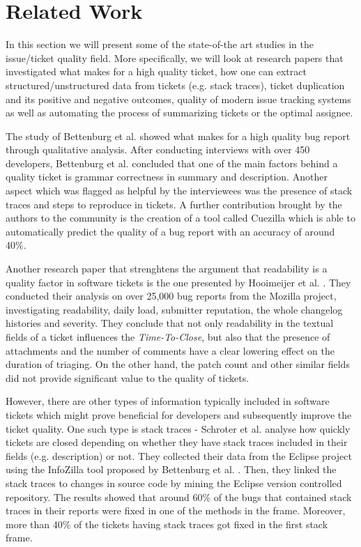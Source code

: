 \documentclass{mpaper}
\begin{document}
\section{Related Work}\label{related_work}

In this section we will present some of the state-of-the art studies in the issue/ticket quality 
field. More specifically, we will look at research papers that investigated what makes for a high quality ticket, 
how one can extract structured/unstructured data from tickets (e.g. stack traces), ticket duplication and its 
positive and negative outcomes, quality of modern issue tracking systems as well as automating the process 
of summarizing tickets or the optimal assignee. 

The study of Bettenburg et al. \cite{bettenburg2008makes} showed what 
makes for a high quality bug report through qualitative analysis. 
After conducting interviews with over 450 developers, Bettenburg et al. concluded that one of the main factors
behind a quality ticket is grammar correctness in summary and description. Another
aspect which was flagged as helpful by the interviewees was the presence of stack 
traces and steps to reproduce in tickets. A further contribution brought by the
authors to the community is the creation of a tool called Cuezilla which is able 
to automatically predict the quality of a bug report with an accuracy of around 40\%.

Another research paper that strenghtens the argument that readability is a quality 
factor in software tickets is the one presented by Hooimeijer et al. \cite{hooimeijer2007modeling}.
They conducted their analysis on over 25,000 bug reports from the Mozilla project, 
investigating readability, daily load, submitter reputation, the whole changelog histories 
and severity. They conclude that not only readability in the textual fields of a ticket
influences the \emph{Time-To-Close}, but also that the presence of attachments and 
the number of comments have a clear lowering effect on the duration of triaging. On the 
other hand, the patch count and other similar fields did not provide significant 
value to the quality of tickets.

However, there are other types of information typically included in software tickets 
which might prove beneficial for developers and subsequently improve the ticket quality.
One such type is stack traces - Schroter et al. \cite{schroter2010stack} analyse how 
quickly tickets are closed depending on whether they have stack traces included in their fields 
(e.g. description) or not. They collected their data from the Eclipse project using 
the InfoZilla tool proposed by Bettenburg et al. \cite{bettenburg2008extracting}.
Then, they linked the stack traces to changes in source code by mining the Eclipse version 
controlled repository. The results showed that 
around 60\% of the bugs that contained stack traces in their reports were fixed
in one of the methods in the frame. Moreover, more than 40\% of the tickets having stack traces
got fixed in the first stack frame.
\end{document}
